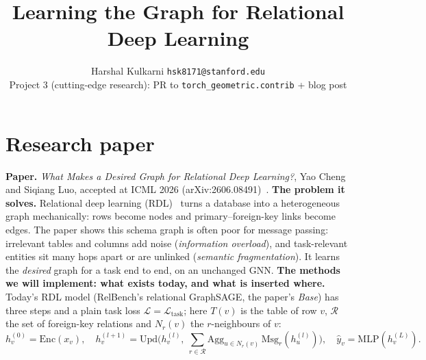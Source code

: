 \documentclass{article}
\title{Learning the Graph for Relational Deep Learning}
\author{%
  Harshal Kulkarni \quad \texttt{hsk8171@stanford.edu} \\
  Project 3 (cutting-edge research): PR to \texttt{torch\_geometric.contrib} + blog post
}
\begin{document}
  
\maketitle
\vspace{-2.4em}
\section{Research paper}
\vspace{-0.5em}
\textbf{Paper.} \emph{What Makes a Desired Graph for Relational Deep Learning?}, Yao Cheng and Siqiang Luo, accepted at ICML 2026 (arXiv:2606.08491)~\cite{cheng2026desired}.
\textbf{The problem it solves.} Relational deep learning (RDL)~\cite{fey2024rdl,rdlsurvey2025} turns a database into a heterogeneous graph mechanically: rows become nodes and primary--foreign-key links become edges. The paper shows this schema graph is often poor for message passing: irrelevant tables and columns add noise (\emph{information overload}), and task-relevant entities sit many hops apart or are unlinked (\emph{semantic fragmentation}). It learns the \emph{desired} graph for a task end to end, on an unchanged GNN.
\textbf{The methods we will implement: what exists today, and what is inserted where.} Today's RDL model (RelBench's relational GraphSAGE, the paper's \emph{Base}) has three steps and a plain task loss $\mathcal L=\mathcal L_{\text{task}}$; here $T(v)$ is the table of row $v$, $\mathcal R$ the set of foreign-key relations and $N_r(v)$ the $r$-neighbours of $v$:
\vspace{-0.1em}
\begin{equation*}
\textstyle
h^{(0)}_v=\mathrm{Enc}(x_v),\quad
h^{(l+1)}_v=\mathrm{Upd}\big(h^{(l)}_v,\ \sum_{r\in\mathcal R}\mathrm{Agg}_{u\in N_r(v)}\,\mathrm{Msg}_r(h^{(l)}_u)\big),\quad
\hat y_v=\mathrm{MLP}(h^{(L)}_v).
\end{equation*}
\vspace{-0.3em}
\end{document}
